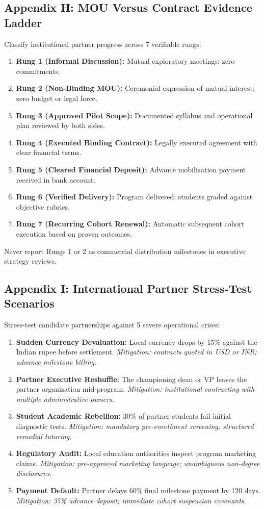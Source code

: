 \subsection*{Appendix H: MOU Versus Contract Evidence Ladder}
\label{sec:app_mou_evidence_ladder}

Classify institutional partner progress across 7 verifiable rungs:
\begin{enumerate}
\item \textbf{Rung 1 (Informal Discussion):} Mutual exploratory meetings; zero commitments.
\item \textbf{Rung 2 (Non-Binding MOU):} Ceremonial expression of mutual interest; zero budget or legal force.
\item \textbf{Rung 3 (Approved Pilot Scope):} Documented syllabus and operational plan reviewed by both sides.
\item \textbf{Rung 4 (Executed Binding Contract):} Legally executed agreement with clear financial terms.
\item \textbf{Rung 5 (Cleared Financial Deposit):} Advance mobilization payment received in bank account.
\item \textbf{Rung 6 (Verified Delivery):} Program delivered; students graded against objective rubrics.
\item \textbf{Rung 7 (Recurring Cohort Renewal):} Automatic subsequent cohort execution based on proven outcomes.
\end{enumerate}
Never report Rungs 1 or 2 as commercial distribution milestones in executive strategy reviews.

\subsection*{Appendix I: International Partner Stress-Test Scenarios}
\label{sec:app_stress_test_scenarios}

Stress-test candidate partnerships against 5 severe operational crises:
\begin{enumerate}
\item \textbf{Sudden Currency Devaluation:} Local currency drops by 15\% against the Indian rupee before settlement. \textit{Mitigation: contracts quoted in USD or INR; advance milestone billing.}
\item \textbf{Partner Executive Reshuffle:} The championing dean or VP leaves the partner organization mid-program. \textit{Mitigation: institutional contracting with multiple administrative owners.}
\item \textbf{Student Academic Rebellion:} 30\% of partner students fail initial diagnostic tests. \textit{Mitigation: mandatory pre-enrollment screening; structured remedial tutoring.}
\item \textbf{Regulatory Audit:} Local education authorities inspect program marketing claims. \textit{Mitigation: pre-approved marketing language; unambiguous non-degree disclosures.}
\item \textbf{Payment Default:} Partner delays 60\% final milestone payment by 120 days. \textit{Mitigation: 35\% advance deposit; immediate cohort suspension covenants.}
\end{enumerate}

